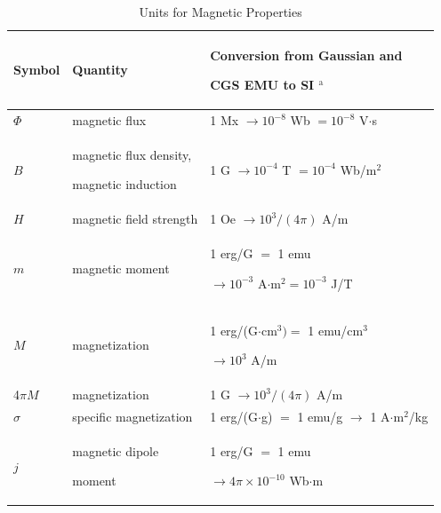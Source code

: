 \documentclass[journal,twoside,web]{ieeecolor}
\begin{document}
\begin{table}
    \caption{Units for Magnetic Properties}
    \label{table}
    \setlength{\tabcolsep}{3pt}
    \begin{tabular}{|p{25pt}|p{75pt}|p{115pt}|}
        \hline
        Symbol                                         &
        Quantity                                       &
        Conversion from Gaussian and \par CGS EMU to SI $^{\mathrm{a}}$                 \\
        \hline
        $\Phi $                                        &
        magnetic flux                                  &
        1 Mx $\to  10^{-8}$ Wb $= 10^{-8}$ V$\cdot $s                                   \\
        $B$                                            &
        magnetic flux density, \par magnetic induction &
        1 G $\to  10^{-4}$ T $= 10^{-4}$ Wb/m$^{2}$                                     \\
        $H$                                            &
        magnetic field strength                        &
        1 Oe $\to  10^{3}/(4\pi )$ A/m                                                  \\
        $m$                                            &
        magnetic moment                                &
        1 erg/G $=$ 1 emu \par $\to 10^{-3}$ A$\cdot $m$^{2} = 10^{-3}$ J/T             \\
        $M$                                            &
        magnetization                                  &
        1 erg/(G$\cdot $cm$^{3}) =$ 1 emu/cm$^{3}$ \par $\to 10^{3}$ A/m                \\
        4$\pi M$                                       &
        magnetization                                  &
        1 G $\to  10^{3}/(4\pi )$ A/m                                                   \\
        $\sigma $                                      &
        specific magnetization                         &
        1 erg/(G$\cdot $g) $=$ 1 emu/g $\to $ 1 A$\cdot $m$^{2}$/kg                     \\
        $j$                                            &
        magnetic dipole \par moment                    &
        1 erg/G $=$ 1 emu \par $\to 4\pi \times  10^{-10}$ Wb$\cdot $m                  \\

\end{tabular}
\end{table}
\end{document}
